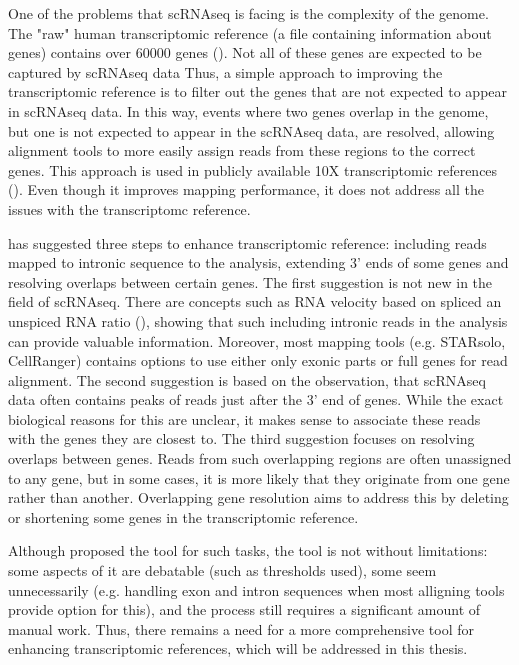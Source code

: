 One of the problems that scRNAseq is facing is the complexity of the genome.
The "raw" human transcriptomic reference (a file containing information about genes)
contains over 60000 genes (\cite{Frankish2022}).
Not all of these genes are expected to be captured by scRNAseq data
Thus, a simple approach to improving the transcriptomic reference is to filter out the genes
that are not expected to appear in scRNAseq data.
In this way, events where two genes overlap in the genome, but one is not expected to appear in the scRNAseq data,
are resolved, allowing alignment tools to more easily assign reads from these regions to the correct genes.
This approach is used in publicly available 10X transcriptomic references (\cite{Zheng2017}).
Even though it improves mapping performance, it does not address all the issues with the transcriptomc reference.

\textcite{Pool2023} has suggested three steps to enhance transcriptomic reference:
including reads mapped to intronic sequence to the analysis, extending 3' ends of some genes and
resolving overlaps between certain genes.
The first suggestion is not new in the field of scRNAseq.
There are concepts such as RNA velocity based on spliced an unspiced RNA ratio (\cite{Manno2018}),
showing that such including intronic reads in the analysis can provide valuable information.
Moreover, most mapping tools (e.g. STARsolo, CellRanger) contains options
to use either only exonic parts or full genes for read alignment.
The second suggestion is based on the observation,
that scRNAseq data often contains peaks of reads just after the 3' end of genes. 
While the exact biological reasons for this are unclear,
it makes sense to associate these reads with the genes they are closest to. 
The third suggestion focuses on resolving overlaps between genes.
Reads from such overlapping regions are often unassigned to any gene,
but in some cases, it is more likely that they originate from one gene rather than another.
Overlapping gene resolution aims to address this by deleting or shortening some genes in the transcriptomic reference.

Although \textcite{Pool2023} proposed the tool for such tasks, the tool is not without limitations:
some aspects of it are debatable (such as thresholds used), some seem unnecessarily
(e.g. handling exon and intron sequences when most alligning tools provide option for this),
and the process still requires a significant amount of manual work.
Thus, there remains a need for a more comprehensive tool for enhancing transcriptomic references,
which will be addressed in this thesis.

